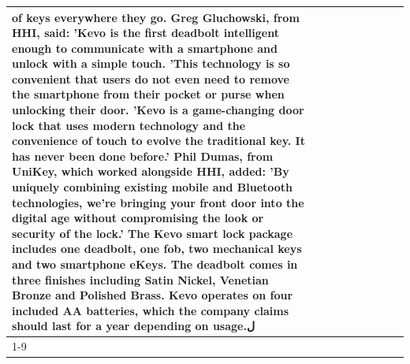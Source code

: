 \begin{table}[H]
\begin{tabular}{lllrlllll}
of keys everywhere they go. Greg Gluchowski, from HHI, said: 'Kevo is the first deadbolt intelligent enough to communicate with a smartphone and unlock with a simple touch. 'This technology is so convenient that users do not even need to remove the smartphone from their pocket or purse when unlocking their door. 'Kevo is a game-changing door lock that uses modern technology and the convenience of touch to evolve the traditional key. It has never been done before.' Phil Dumas, from UniKey, which worked alongside HHI, added: 'By uniquely combining existing mobile and Bluetooth technologies, we’re bringing your front door into the digital age without compromising the look or security of the lock.' The Kevo smart lock package includes one deadbolt, one fob, two mechanical keys and two smartphone eKeys. The deadbolt comes in three finishes including Satin Nickel, Venetian Bronze and Polished Brass. Kevo operates on four included AA batteries, which the company claims should last for a year depending on usage.ْل \\
\cline{1-9}

\end{tabular}
\end{table}
